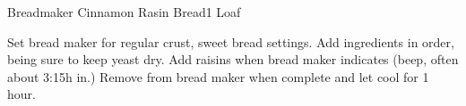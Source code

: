 \begin{recipe}{Breadmaker Cinnamon Rasin Bread}{1 Loaf}{}



    Set bread maker for regular crust, sweet bread settings. Add ingredients in order, being sure to keep yeast dry. Add raisins when bread maker indicates (beep, often about 3:15h in.) Remove from bread maker when complete and let cool for 1 hour.

\end{recipe}